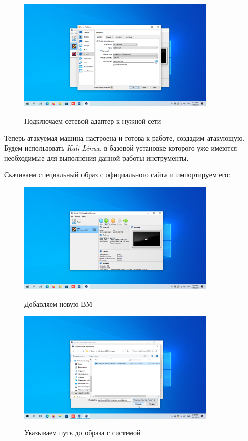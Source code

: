 \documentclass[a4paper]{article}
\begin{document}
  \begin{figure}[H]
    \centering
    \includegraphics[width=0.85\textwidth]{04_0031}
    \label{img:7}
    \caption{Подключаем сетевой адаптер к нужной сети}
  \end{figure}

  Теперь атакуемая машина настроена и готова к работе, создадим атакующую.
  Будем использовать \textit{Kali Linux}, в базовой установке которого уже имеются
  необходимые для выполнения данной работы инструменты.

  Скачиваем специальный образ с официального сайта и импортируем его:

  \begin{figure}[H]
    \centering
    \includegraphics[width=0.85\textwidth]{04_0008}
    \label{img:8}
    \caption{Добавляем новую ВМ}
  \end{figure}

  \begin{figure}[H]
    \centering
    \includegraphics[width=0.85\textwidth]{04_0009}
    \label{img:9}
    \caption{Указываем путь до образа с системой}
  \end{figure}
\end{document}
